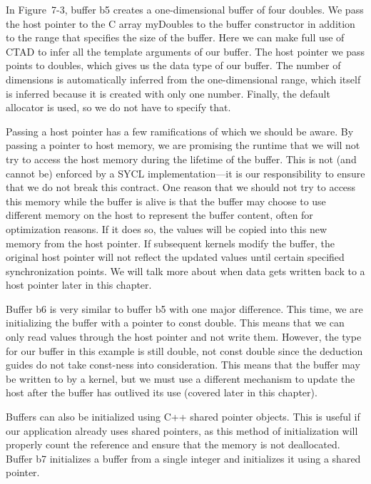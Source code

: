 In Figure 7-3, buffer b5 creates a one-dimensional buffer of four doubles. We pass the host pointer to the C array myDoubles to the buffer constructor in addition to the range that specifies the size of the buffer. Here we can make full use of CTAD to infer all the template arguments of our buffer. The host pointer we pass points to doubles, which gives us the data type of our buffer. The number of dimensions is automatically inferred from the one-dimensional range, which itself is inferred because it is created with only one number. Finally, the default allocator is used, so we do not have to specify that.\par

Passing a host pointer has a few ramifications of which we should be aware. By passing a pointer to host memory, we are promising the runtime that we will not try to access the host memory during the lifetime of the buffer. This is not (and cannot be) enforced by a SYCL implementation—it is our responsibility to ensure that we do not break this contract. One reason that we should not try to access this memory while the buffer is alive is that the buffer may choose to use different memory on the host to represent the buffer content, often for optimization reasons. If it does so, the values will be copied into this new memory from the host pointer. If subsequent kernels modify the buffer, the original host pointer will not reflect the updated values until certain specified synchronization points. We will talk more about when data gets written back to a host pointer later in this chapter.\par

Buffer b6 is very similar to buffer b5 with one major difference. This time, we are initializing the buffer with a pointer to const double. This means that we can only read values through the host pointer and not write them. However, the type for our buffer in this example is still double, not const double since the deduction guides do not take const-ness into consideration. This means that the buffer may be written to by a kernel, but we must use a different mechanism to update the host after the buffer has outlived its use (covered later in this chapter).\par

Buffers can also be initialized using C++ shared pointer objects. This is useful if our application already uses shared pointers, as this method of initialization will properly count the reference and ensure that the memory is not deallocated. Buffer b7 initializes a buffer from a single integer and initializes it using a shared pointer.\par

